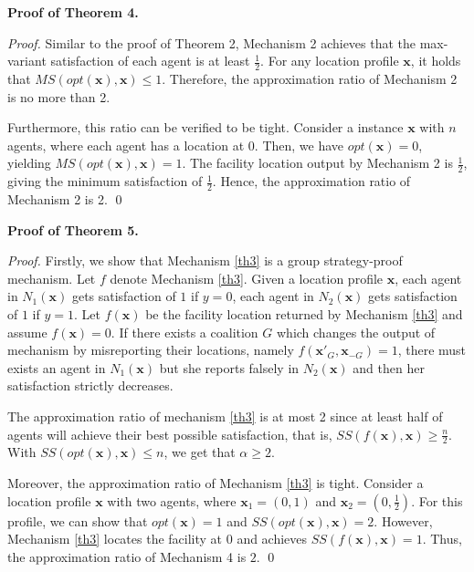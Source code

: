\documentclass[runningheads]{11llncst}
\begin{document}
\noindent
\textbf{Proof of Theorem 4.}
\begin{proof}
    Similar to the proof of Theorem 2, Mechanism 2 achieves that the max-variant satisfaction of each agent is at least $\frac{1}{2}$. For any location profile $\textbf{x}$, it holds that $MS(opt(\textbf{x}),\textbf{x})\leq1$. Therefore, the approximation ratio of Mechanism 2 is no more than 2. 
    
    Furthermore, this ratio can be verified to be tight. Consider a instance $\textbf{x}$ with $n$ agents, where each agent has a location at $0$. Then, we have $opt(\textbf{x})=0$, yielding $MS(opt(\textbf{x}),\textbf{x})=1$. The facility location output by Mechanism 2 is $\frac{1}{2}$, giving the minimum satisfaction of $\frac{1}{2}$. Hence, the approximation ratio of Mechanism 2 is 2. \qed
\end{proof}




\noindent
\textbf{Proof of Theorem 5.}

\begin{proof}
    Firstly, we show that Mechanism \ref{th3} is a group strategy-proof mechanism. Let $f$ denote Mechanism \ref{th3}. Given a location profile $\textbf{x}$, each agent in $N_1(\textbf{x})$ gets satisfaction of $1$ if $y=0$, each agent in $N_2(\textbf{x})$ gets satisfaction of $1$ if $y=1$. Let $f(\textbf{x})$ be the facility location returned by Mechanism \ref{th3} and assume $f(\textbf{x})=0$. If there exists a coalition $G$ which changes the output of mechanism by misreporting their locations, namely  $f(\textbf{x}'_G, \textbf{x}_{-G})=1$, there must exists an agent in $N_1(\textbf{x})$ but she reports falsely in $N_2(\textbf{x})$ and then  her satisfaction strictly decreases.
    
    The approximation ratio of mechanism \ref{th3} is at most 2 since at least half of  agents will achieve their best possible satisfaction, that is, $SS(f(\textbf{x}),\textbf{x})\geq\frac{n}{2}$. With $SS(opt(\textbf{x}),\textbf{x})\leq n$, we get that $\alpha\geq2$.

    Moreover, the approximation ratio of Mechanism \ref{th3} is tight. Consider a location profile $\textbf{x}$ with two agents, where $\textbf{x}_1=(0,1)$ and $\textbf{x}_2=(0,\frac{1}{2})$. For this profile, we can show that $opt(\textbf{x})=1$ and  $SS(opt(\textbf{x}),\textbf{x})=2$. However, Mechanism \ref{th3} locates the facility at $0$ and achieves  $SS(f(\textbf{x}),\textbf{x})=1$. Thus, the approximation ratio of Mechanism 4 is $2$.  \qed
\end{proof}
\end{document}

